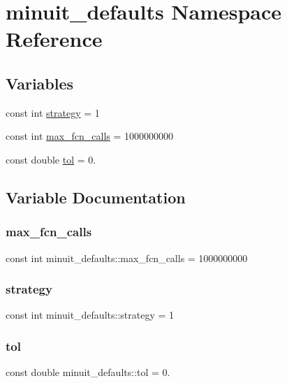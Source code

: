 \hypertarget{namespaceminuit__defaults}{}\section{minuit\+\_\+defaults Namespace Reference}
\label{namespaceminuit__defaults}
\subsection*{Variables}
\begin{DoxyCompactItemize}
\item 
const int \mbox{\hyperlink{namespaceminuit__defaults_aa9f51502bc49076096a17148f99419ef}{strategy}} = 1
\item 
const int \mbox{\hyperlink{namespaceminuit__defaults_ae82f07dfabb94bc18a2f4896efc92a05}{max\+\_\+fcn\+\_\+calls}} = 1000000000
\item 
const double \mbox{\hyperlink{namespaceminuit__defaults_aa058e63296dfd3f6f5efffcdb07d3d12}{tol}} = 0.
\end{DoxyCompactItemize}


\subsection{Variable Documentation}
\mbox{\label{namespaceminuit__defaults_ae82f07dfabb94bc18a2f4896efc92a05}} 
\subsubsection{\texorpdfstring{max\_fcn\_calls}{max\_fcn\_calls}}
{\footnotesize\ttfamily const int minuit\+\_\+defaults\+::max\+\_\+fcn\+\_\+calls = 1000000000}

\mbox{\label{namespaceminuit__defaults_aa9f51502bc49076096a17148f99419ef}} 
\subsubsection{\texorpdfstring{strategy}{strategy}}
{\footnotesize\ttfamily const int minuit\+\_\+defaults\+::strategy = 1}

\mbox{\label{namespaceminuit__defaults_aa058e63296dfd3f6f5efffcdb07d3d12}} 
\subsubsection{\texorpdfstring{tol}{tol}}
{\footnotesize\ttfamily const double minuit\+\_\+defaults\+::tol = 0.}

